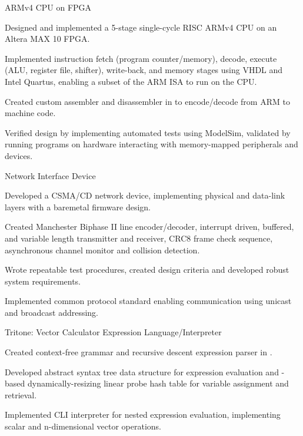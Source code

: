 \documentclass[11pt]{article}
\begin{document}
\sectionproj
{ARMv4 CPU on FPGA} 
{\begin{circlist}
  \item Designed and implemented a 5-stage single-cycle RISC ARMv4 CPU on an Altera MAX 10 FPGA. 
  \item Implemented instruction fetch (program counter/memory), decode, execute (ALU, register file, shifter), write-back, and memory stages using VHDL and Intel Quartus, enabling a subset of the ARM ISA to run on the CPU.
  \item Created custom assembler and disassembler in  to encode/decode from ARM to machine code.
  \item Verified design by implementing automated tests using ModelSim, validated by running programs on hardware interacting with memory-mapped peripherals and devices.
\end{circlist}}

\sectionproj
{Network Interface Device} 
{\begin{circlist}
  \item Developed a CSMA/CD network device, implementing physical and data-link layers with a baremetal firmware design.
  \item Created Manchester Biphase II line encoder/decoder, interrupt driven, buffered, and variable length transmitter and receiver, CRC8 frame check sequence, asynchronous channel monitor and collision detection.
  \item Wrote repeatable test procedures, created design criteria and developed robust system requirements.
  \item Implemented common protocol standard enabling communication using unicast and broadcast addressing.
\end{circlist}}

\sectionproj
{Tritone: Vector Calculator Expression Language/Interpreter} 
{\begin{circlist}
  \item Created context-free grammar and recursive descent expression parser in .
  \item Developed abstract syntax tree data structure for expression evaluation and -based dynamically-resizing linear probe hash table for variable assignment and retrieval.
  \item Implemented CLI interpreter for nested expression evaluation, implementing scalar and n-dimensional vector operations. 
\end{circlist}}
\end{document}
